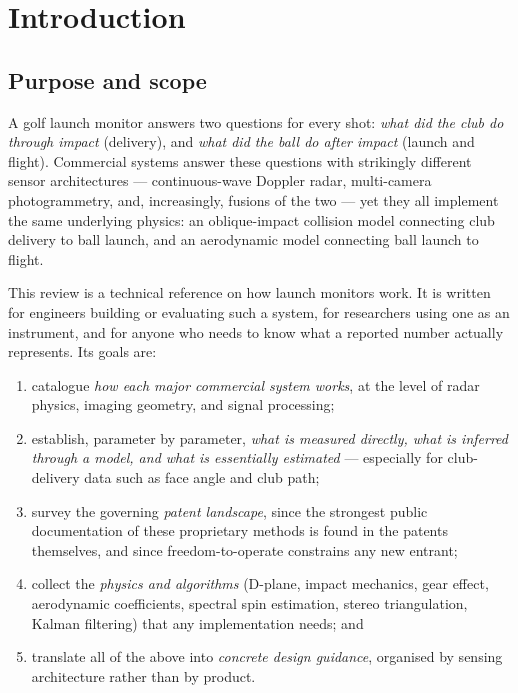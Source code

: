 \chapter{Introduction}
\label{ch:intro}

\section{Purpose and scope}

A golf launch monitor answers two questions for every shot: \emph{what did
the club do through impact} (delivery), and \emph{what did the ball do after
impact} (launch and flight). Commercial systems answer these questions with
strikingly different sensor architectures --- continuous-wave Doppler radar,
multi-camera photogrammetry, and, increasingly, fusions of the two --- yet
they all implement the same underlying physics: an oblique-impact collision
model connecting club delivery to ball launch, and an aerodynamic model
connecting ball launch to flight.

This review is a technical reference on how launch monitors work. It is
written for engineers building or evaluating such a system, for researchers
using one as an instrument, and for anyone who needs to know what a reported
number actually represents. Its goals are:

\begin{enumerate}[itemsep=2pt]
  \item catalogue \emph{how each major commercial system works}, at the level
        of radar physics, imaging geometry, and signal processing;
  \item establish, parameter by parameter, \emph{what is measured directly,
        what is inferred through a model, and what is essentially
        estimated} --- especially for club-delivery data such as face angle
        and club path;
  \item survey the governing \emph{patent landscape}, since the strongest
        public documentation of these proprietary methods is found in the
        patents themselves, and since freedom-to-operate constrains any
        new entrant;
  \item collect the \emph{physics and algorithms} (D-plane, impact mechanics,
        gear effect, aerodynamic coefficients, spectral spin estimation,
        stereo triangulation, Kalman filtering) that any implementation
        needs; and
  \item translate all of the above into \emph{concrete design guidance},
        organised by sensing architecture rather than by product.
\end{enumerate}

